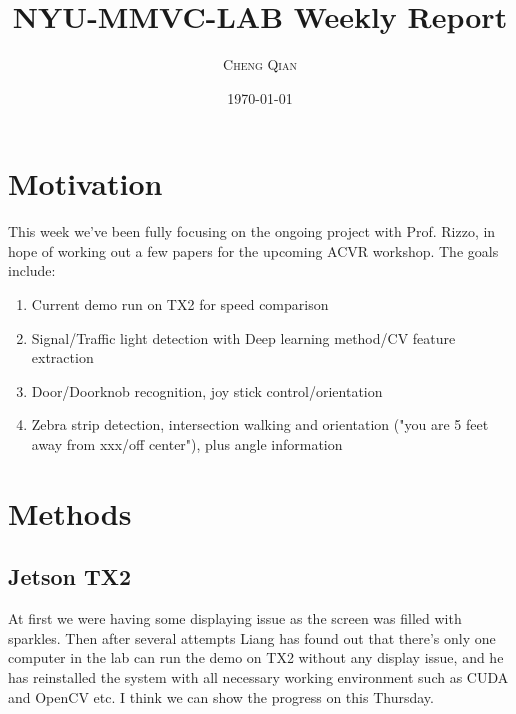 \documentclass{article}
\title{NYU-MMVC-LAB Weekly Report} %
\author{\textsc{Cheng Qian}} %
\date{\today} %
\begin{document}
\maketitle %




\section{Motivation}

This week we've been fully focusing on the ongoing project with Prof. Rizzo, in hope of working out a few papers for the upcoming ACVR workshop. The goals include:
\begin{enumerate}
	\item Current demo run on TX2 for speed comparison
	\item Signal/Traffic light detection with Deep learning method/CV feature extraction
	\item Door/Doorknob recognition, joy stick control/orientation
	\item Zebra strip detection, intersection walking and orientation ("you are 5 feet away from xxx/off center"), plus angle information
\end{enumerate}




\section{Methods}
\subsection{Jetson TX2}
At first we were having some displaying issue as the screen was filled with sparkles. Then after several attempts Liang has found out that there's only one computer in the lab can run the demo on TX2 without any display issue, and he has reinstalled the system with all necessary working environment such as CUDA and OpenCV etc. I think we can show the progress on this Thursday.
\end{document}
